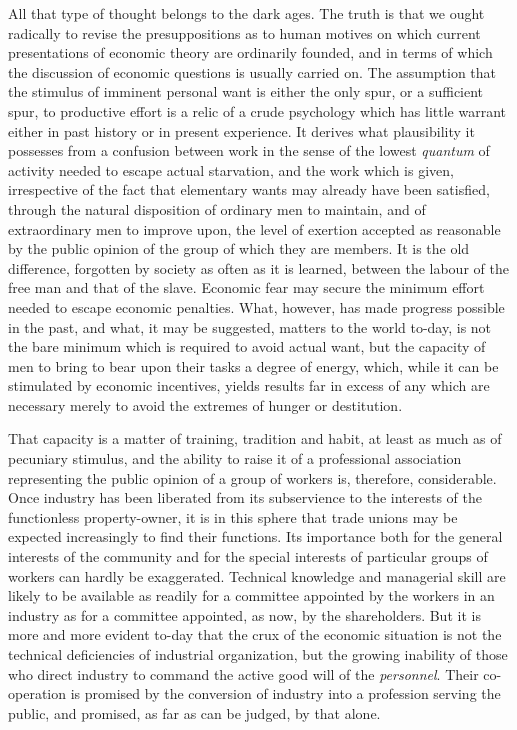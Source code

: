 \documentclass{book}
\begin{document}
All that type of thought belongs to the dark ages. The truth is that we ought radically to revise the presuppositions as to human motives on which current presentations of economic theory are ordinarily founded, and in terms of which the discussion of economic questions is usually carried on. The assumption that the stimulus of imminent personal want is either the only spur, or a sufficient spur, to productive effort is a relic of a crude psychology which has little warrant either in past history or in present experience. It derives what plausibility it possesses from a confusion between work in the sense of the lowest \emph{quantum} of activity needed to escape actual starvation, and the work which is given, irrespective of the fact that elementary wants may already have been satisfied, through the natural disposition of ordinary men to maintain, and of extraordinary men to improve upon, the level of exertion accepted as reasonable by the public opinion of the group of which they are members. It is the old difference, forgotten by society as often as it is learned, between the labour of the free man and that of the slave. Economic fear may secure the minimum effort needed to escape economic penalties. What, however, has made progress possible in the past, and what, it may be suggested, matters to the world to-day, is not the bare minimum which is required to avoid actual want, but the capacity of men to bring to bear upon their tasks a degree of energy, which, while it can be stimulated by economic incentives, yields results far in excess of any which are necessary merely to avoid the extremes of hunger or destitution.

That capacity is a matter of training, tradition and habit, at least as much as of pecuniary stimulus, and the ability to raise it of a professional association representing the public opinion of a group of workers is, therefore, considerable. Once industry has been liberated from its subservience to the interests of the functionless property-owner, it is in this sphere that trade unions may be expected increasingly to find their functions. Its importance both for the general interests of the community and for the special interests of particular groups of workers can hardly be exaggerated. Technical knowledge and managerial skill are likely to be available as readily for a committee appointed by the workers in an industry as for a committee appointed, as now, by the shareholders. But it is more and more evident to-day that the crux of the economic situation is not the technical deficiencies of industrial organization, but the growing inability of those who direct industry to command the active good will of the \emph{personnel}. Their co-operation is promised by the conversion of industry into a profession serving the public, and promised, as far as can be judged, by that alone.
\end{document}
